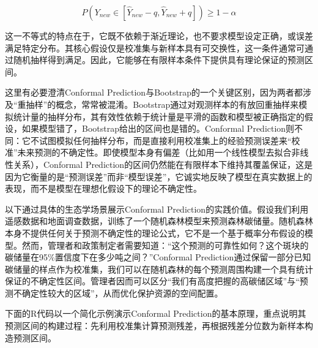 \documentclass[
  twoside,12pt,fontset=none]{ctexbook}
\begin{document}
\[P(Y_{new} \in [\hat{Y}_{new} - q, \hat{Y}_{new} + q]) \geq 1 - \alpha\]

这一不等式的特点在于，它既不依赖于渐近理论，也不要求模型设定正确，或误差满足特定分布。其核心假设仅是校准集与新样本具有可交换性，这一条件通常可通过随机抽样得到满足。因此，它能够在有限样本条件下提供具有理论保证的预测区间。

这里有必要澄清Conformal Prediction与Bootstrap的一个关键区别，因为两者都涉及``重抽样''的概念，常常被混淆。Bootstrap通过对观测样本的有放回重抽样来模拟统计量的抽样分布，其有效性依赖于统计量是平滑的函数和模型被正确指定的假设，如果模型错了，Bootstrap给出的区间也是错的。Conformal Prediction则不同：它不试图模拟任何抽样分布，而是直接利用校准集上的经验预测误差来``校准''未来预测的不确定性。即使模型本身有偏差（比如用一个线性模型去拟合非线性关系），Conformal Prediction的区间仍然能在有限样本下维持其覆盖保证，这是因为它衡量的是``预测误差''而非``模型误差''，它诚实地反映了模型在真实数据上的表现，而不是模型在理想化假设下的理论不确定性。

以下通过具体的生态学场景展示Conformal Prediction的实践价值。假设我们利用遥感数据和地面调查数据，训练了一个随机森林模型来预测森林碳储量。随机森林本身不提供任何关于预测不确定性的理论公式，它不是一个基于概率分布假设的模型。然而，管理者和政策制定者需要知道：``这个预测的可靠性如何？这个斑块的碳储量在95\%置信度下在多少吨之间？''Conformal Prediction通过保留一部分已知碳储量的样点作为校准集，我们可以在随机森林的每个预测周围构建一个具有统计保证的不确定性区间。管理者因而可以区分``我们有高度把握的高碳储区域''与``预测不确定性较大的区域''，从而优化保护资源的空间配置。

下面的R代码以一个简化示例演示Conformal Prediction的基本原理，重点说明其预测区间的构建过程：先利用校准集计算预测残差，再根据残差分位数为新样本构造预测区间。
\end{document}
